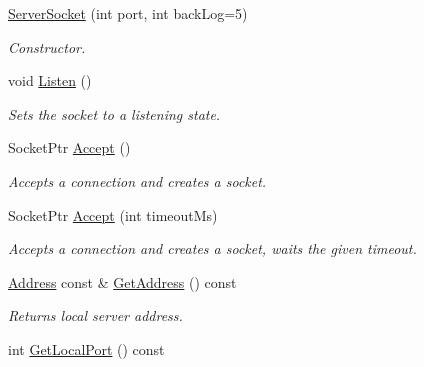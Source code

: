 \begin{DoxyCompactItemize}
\item 
\hyperlink{class_common_1_1_server_socket_a5f4eb8602a8dc21db806b7d45cd9d887}{Server\-Socket} (int port, int back\-Log=5)
\begin{DoxyCompactList}\small\item\em Constructor. \end{DoxyCompactList}\item 
\hypertarget{class_common_1_1_server_socket_a2d330848e8f6eb4858d0a6037c734f1b}{void \hyperlink{class_common_1_1_server_socket_a2d330848e8f6eb4858d0a6037c734f1b}{Listen} ()}\label{class_common_1_1_server_socket_a2d330848e8f6eb4858d0a6037c734f1b}

\begin{DoxyCompactList}\small\item\em Sets the socket to a listening state. \end{DoxyCompactList}\item 
\hypertarget{class_common_1_1_server_socket_a1dd43d8a49feb6b39b26b3616b8d5273}{Socket\-Ptr \hyperlink{class_common_1_1_server_socket_a1dd43d8a49feb6b39b26b3616b8d5273}{Accept} ()}\label{class_common_1_1_server_socket_a1dd43d8a49feb6b39b26b3616b8d5273}

\begin{DoxyCompactList}\small\item\em Accepts a connection and creates a socket. \end{DoxyCompactList}\item 
\hypertarget{class_common_1_1_server_socket_ace551f50347ca514eead71c6775230e3}{Socket\-Ptr \hyperlink{class_common_1_1_server_socket_ace551f50347ca514eead71c6775230e3}{Accept} (int timeout\-Ms)}\label{class_common_1_1_server_socket_ace551f50347ca514eead71c6775230e3}

\begin{DoxyCompactList}\small\item\em Accepts a connection and creates a socket, waits the given timeout. \end{DoxyCompactList}\item 
\hypertarget{class_common_1_1_server_socket_a4385aed2d50f6f4677405063f41b7ff8}{\hyperlink{class_common_1_1_address}{Address} const \& \hyperlink{class_common_1_1_server_socket_a4385aed2d50f6f4677405063f41b7ff8}{Get\-Address} () const }\label{class_common_1_1_server_socket_a4385aed2d50f6f4677405063f41b7ff8}

\begin{DoxyCompactList}\small\item\em Returns local server address. \end{DoxyCompactList}\item 
\hypertarget{class_common_1_1_server_socket_af429415c5735b7b3136fd2112888222d}{int \hyperlink{class_common_1_1_server_socket_af429415c5735b7b3136fd2112888222d}{Get\-Local\-Port} () const }\label{class_common_1_1_server_socket_af429415c5735b7b3136fd2112888222d}


\end{DoxyCompactItemize}

